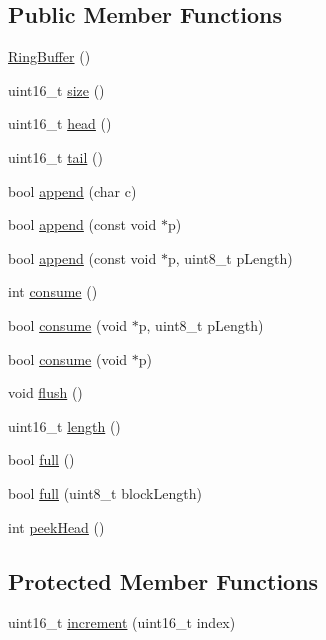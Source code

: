 \subsection*{Public Member Functions}
\begin{DoxyCompactItemize}
\item 
\hyperlink{classflame_1_1_ring_buffer_aa79ec1379a8e0f4785343f1fa59d0bee}{Ring\-Buffer} ()
\item 
uint16\-\_\-t \hyperlink{classflame_1_1_ring_buffer_a473b7401a5b6801b54523bd5e835739b}{size} ()
\item 
uint16\-\_\-t \hyperlink{classflame_1_1_ring_buffer_ace06648c284c5907b97b613333161010}{head} ()
\item 
uint16\-\_\-t \hyperlink{classflame_1_1_ring_buffer_a442f72d57cad307ec7b3c4bf76b1821b}{tail} ()
\item 
bool \hyperlink{classflame_1_1_ring_buffer_aaea51784145687f9e96531efb42e710f}{append} (char c)
\item 
bool \hyperlink{classflame_1_1_ring_buffer_afdfe6d29affdb2cda2859ee99f216efb}{append} (const void $\ast$p)
\item 
bool \hyperlink{classflame_1_1_ring_buffer_a51d857b8f879e16deb5a5a6f6f26ee39}{append} (const void $\ast$p, uint8\-\_\-t p\-Length)
\item 
int \hyperlink{classflame_1_1_ring_buffer_afe46197978f705f5c49fa6175b1005e8}{consume} ()
\item 
bool \hyperlink{classflame_1_1_ring_buffer_a79bb84830e97b889f069105f293f9cff}{consume} (void $\ast$p, uint8\-\_\-t p\-Length)
\item 
bool \hyperlink{classflame_1_1_ring_buffer_ac3c660ef536662f7af65de50ff7199f7}{consume} (void $\ast$p)
\item 
void \hyperlink{classflame_1_1_ring_buffer_ab2ba45675a348dfe2e31554de4f2fddf}{flush} ()
\item 
uint16\-\_\-t \hyperlink{classflame_1_1_ring_buffer_a6b7772f29604b611eb6ad202e5fbcfdb}{length} ()
\item 
bool \hyperlink{classflame_1_1_ring_buffer_adc5bebc1be0a2ca4e6b073eff3c2e2b3}{full} ()
\item 
bool \hyperlink{classflame_1_1_ring_buffer_aa827d88e5d9b53a10d60e0160f51d37c}{full} (uint8\-\_\-t block\-Length)
\item 
int \hyperlink{classflame_1_1_ring_buffer_a7068eccfcd8bf889bc35de9adabd0935}{peek\-Head} ()
\end{DoxyCompactItemize}
\subsection*{Protected Member Functions}
\begin{DoxyCompactItemize}
\item 
uint16\-\_\-t \hyperlink{classflame_1_1_ring_buffer_a94f253a81991f07e6db59943ea2dc267}{increment} (uint16\-\_\-t index)
\end{DoxyCompactItemize}
